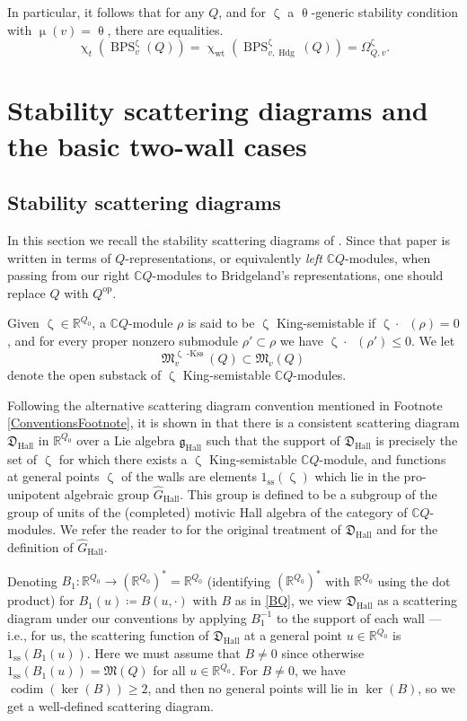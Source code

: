 \documentclass{amsart}
\newcommand{\Mst}{\mathfrak{M}}
\DeclareMathOperator{\opp}{op}
\DeclareMathOperator{\kss}{-Kss}
\DeclareMathOperator{\codim}{codim}
\DeclareMathOperator{\Wt}{wt}
\DeclareMathOperator{\BPS}{BPS}
\DeclareMathOperator{\udim}{\underline{\dim}}
\DeclareMathOperator{\Hall}{Hall}
\DeclareMathOperator{\Hodge}{Hdg}
\let\bb=\mathbb
\let\rar=\rightarrow
\let\f=\mathfrak
\renewcommand{\theta}{\uptheta}
\renewcommand{\zeta}{\upzeta}
\renewcommand{\chi}{\upchi}
\renewcommand{\mu}{\upmu}
\theoremstyle{plain}%
\theoremstyle{definition}
\theoremstyle{remark}
\begin{document}
In particular, it follows that for any $Q$, and for $\zeta$ a $\theta$-generic stability condition with $\mu(v)=\theta$, there are equalities.
\[
\chi_t(\BPS_{v}^{\zeta}(Q))=\chi_{\Wt}(\BPS_{v,\Hodge}^{\zeta}(Q))=\Omega_{Q,v}^{\zeta}.
\]


\section{Stability scattering diagrams and the basic two-wall cases}\label{2wallSection}

\subsection{Stability scattering diagrams}
\label{acyclic_sec}

In this section we recall the stability scattering diagrams of \cite{Bridge}.  Since that paper is written in terms of $Q$-representations, or equivalently \textit{left} $\mathbb{C}Q$-modules, when passing from our right $\mathbb{C}Q$-modules to Bridgeland's representations, one should replace $Q$ with $Q^{\opp}$.  

Given $\zeta\in \mathbb{R}^{Q_0}$, a $\mathbb{C}Q$-module $\rho$ is said to be $\zeta$ King-semistable if $\zeta\cdot \udim(\rho)=0$, and for every proper nonzero submodule $\rho'\subset \rho$ we have $\zeta\cdot\udim(\rho')\leq 0$.  We let 
\[
\Mst^{\zeta \kss}_v(Q)\subset \Mst_v(Q)
\]
denote the open substack of $\zeta$ King-semistable $\mathbb{C}Q$-modules.



Following the alternative scattering diagram convention mentioned in Footnote \ref{ConventionsFootnote}, it is shown in \cite{Bridge} that there is a consistent scattering diagram $\f{D}_{\Hall}$ in $\mathbb{R}^{Q_0}$
over a Lie algebra $\mathfrak{g}_{\Hall}$ such that the support of $\f{D}_{\Hall}$ is precisely the set of $\zeta$ for which there exists a $\zeta$ King-semistable $\mathbb{C}Q$-module, and functions at general points $\zeta$ of the walls are elements $1_{\mathrm{ss}}(\zeta)$ which lie in the pro-unipotent algebraic group $\hat{G}_{\Hall}$.   This group is defined to be a subgroup of the group of units of the (completed) motivic Hall algebra of the category of $\mathbb{C}Q$-modules.  We refer the reader to \cite[\S 5--6]{Bridge} for the original treatment of $\f{D}_{\Hall}$ and for the definition of $\hat{G}_{\Hall}$.

Denoting $B_1\colon \bb{R}^{Q_0}\rar (\bb{R}^{Q_0})^* = \bb{R}^{Q_0}$ (identifying $(\bb{R}^{Q_0})^*$ with $\bb{R}^{Q_0}$ using the dot product) for $B_1(u)\coloneqq B(u,\cdot)$ with $B$ as in \eqref{BQ}, we view $\f{D}_{\Hall}$ as a scattering diagram under our conventions by applying $B_1^{-1}$ to the support of each wall --- i.e., for us, the scattering function of $\f{D}_{\Hall}$ at a general point $u\in \bb{R}^{Q_0}$ is $1_{\mathrm{ss}}(B_1(u))$.  Here we must assume that $B\neq 0$ since otherwise $1_{\mathrm{ss}}(B_1(u))=\f{M}(Q)$ for all $u\in \bb{R}^{Q_0}$.  For $B\neq 0$, we have $\codim (\ker(B))\geq 2$, and then no general points will lie in $\ker(B)$,  so we get a well-defined scattering diagram.
\end{document}
